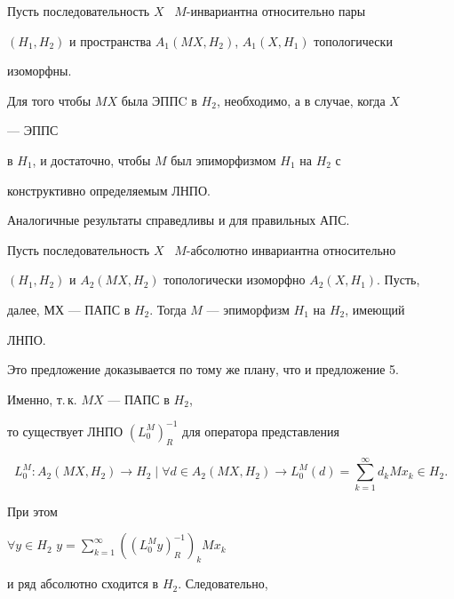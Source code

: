 \begin{cornonum}


Пусть последовательность $X$ \ $M$-инвариантна относительно пары


$(H_1,H_2)$ и пространства $A_1(MX,H_2)$, $A_1(X,H_1)$ топологически


изоморфны.


Для того чтобы $MX$ была ЭППC в $H_2$, необходимо, а в случае, когда $X$


--- ЭППС


в $H_1$, и достаточно, чтобы $M$ был эпиморфизмом $H_1$ на $H_2$ с


конструктивно определяемым ЛНПО.


\end{cornonum}





Аналогичные результаты справедливы и для правильных АПС.








\begin{prop}


Пусть последовательность $X$ \ $M$-абсолютно инвариантна относительно


$(H_1,H_2)$ и $A_2(MX,H_2)$ топологически изоморфно $A_2(X,H_1)$. Пусть,


далее, МХ --- ПАПС в $H_2$. Тогда $M$ --- эпиморфизм $H_1$ на $H_2$, имеющий


ЛНПО.


\end{prop}





Это предложение доказывается по тому же плану, что и предложение 5.


Именно, т.\,к. $MX$ --- ПАПС в $H_2$,


то существует ЛНПО $(L_0^M)_R^{-1}$ для оператора представления


$$


L_0^M: A_2(MX,H_2)\to H_2\mid \forall d\in A_2(MX,H_2)\to


L_0^M(d)=\sum_{k=1}^{\infty}d_kMx_k\in H_2.


$$


При этом


$\forall y\in H_2$ \; $y=\sum\limits_{k=1}^{\infty}((L_0^My)_R^{-1})_kMx_k$


и ряд абсолютно сходится в $H_2$. Следовательно, 


